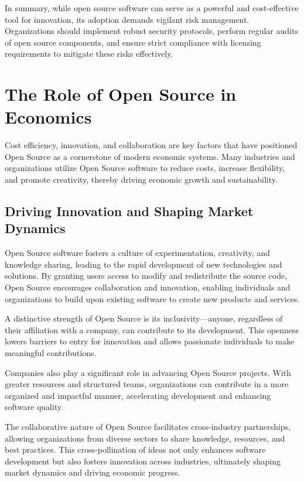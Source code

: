 \cite{OpenSource-Software-Risks-ConnectWise}

In summary, while open source software can serve as a powerful and cost-effective tool for innovation, its adoption demands vigilant risk management. Organizations should implement robust security protocols, perform regular audits of open source components, and ensure strict compliance with licensing requirements to mitigate these risks effectively.


\section{The Role of Open Source in Economics}

Cost efficiency, innovation, and collaboration are key factors that have positioned Open Source as a cornerstone of modern economic systems. Many industries and organizations utilize Open Source software to reduce costs, increase flexibility, 
and promote creativity, thereby driving economic growth and sustainability.

\subsection{Driving Innovation and Shaping Market Dynamics}

Open Source software fosters a culture of experimentation, creativity, and knowledge sharing, 
leading to the rapid development of new technologies and solutions. By granting users access to modify and redistribute the source code, 
Open Source encourages collaboration and innovation, 
enabling individuals and organizations to build upon existing software to create new products and services.

A distinctive strength of Open Source is its inclusivity—anyone, regardless of their affiliation with a company,
can contribute to its development. 
This openness lowers barriers to entry for innovation and allows passionate individuals to make meaningful contributions.

Companies also play a significant role in advancing Open Source projects. 
With greater resources and structured teams, organizations can contribute in a more organized and impactful manner, 
accelerating development and enhancing software quality.

The collaborative nature of Open Source facilitates cross-industry partnerships, 
allowing organizations from diverse sectors to share knowledge, resources, and best practices. 
This cross-pollination of ideas not only enhances software development but also fosters innovation across industries, 
ultimately shaping market dynamics and driving economic progress.

